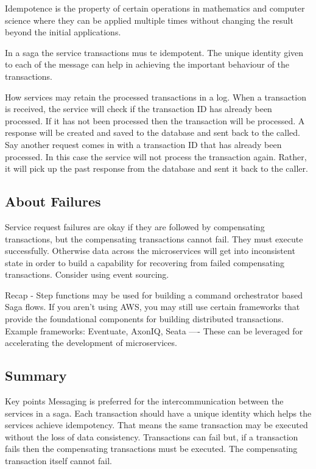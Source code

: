 Idempotence is the property of certain operations in mathematics and computer science where they can be applied multiple times without changing the result beyond the initial applications.

In a saga the service transactions mus te idempotent.
The unique identity given to each of the message can help in achieving the important behaviour of the transactions.

How services may retain the processed transactions in a log.
When a transaction is received, the service will check if the transaction ID has already been processed.
If it has not been processed then the transaction will be processed.
A response will be created and saved to the database and sent back to the called.
Say another request comes in with a transaction ID that has already been processed.
In this case the service will not process the transaction again.
Rather, it will pick up the past response from the database and sent it back to the caller.

\subsection{About Failures}
Service request failures are okay if they are followed by compensating transactions, but the compensating transactions cannot fail.
They must execute successfully.
Otherwise data across the microservices will get into inconsistent state in order to build a capability for recovering from failed compensating transactions.
Consider using event sourcing.

Recap - Step functions may be used for building a command orchestrator based Saga flows.
If you aren't using AWS, you may still use certain frameworks that provide the foundational components for building distributed transactions.
Example frameworks: Eventuate, AxonIQ, Seata ---- These can be leveraged for accelerating the development of microservices.

\subsection{Summary}
Key points
Messaging is preferred for the intercommunication between the services in a saga.
Each transaction should have a unique identity which helps the services achieve idempotency.
That means the same transaction may be executed without the loss of data consistency.
Transactions can fail but, if a transaction fails then the compensating transactions must be executed.
The compensating transaction itself cannot fail.



